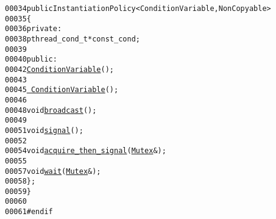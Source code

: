 \begin{footnotesize}
\begin{alltt}
00034         \textcolor{keyword}{public} InstantiationPolicy<ConditionVariable, NonCopyable>
00035     \{
00036         \textcolor{keyword}{private}:
00038             pthread\_cond\_t * \textcolor{keyword}{const} \_cond;
00039 
00040         \textcolor{keyword}{public}:
00042             \hyperlink{classeos_1_1ConditionVariable_a64b2350d3ef0bf6c58f0f063da7a4ea4}{ConditionVariable}();
00043 
00045             \hyperlink{classeos_1_1ConditionVariable_abf981bbbce2e09c235d461f7aea14479}{~ConditionVariable}();
00046 
00048             \textcolor{keywordtype}{void} \hyperlink{classeos_1_1ConditionVariable_a353db40ed7ea89d107627a4f32b829fe}{broadcast}();
00049 
00051             \textcolor{keywordtype}{void} \hyperlink{classeos_1_1ConditionVariable_a58e81670564c2096dcfdbf34dba8f4a4}{signal}();
00052 
00054             \textcolor{keywordtype}{void} \hyperlink{classeos_1_1ConditionVariable_adc82f6f8edc7d82776fe183d7f647d2c}{acquire_then_signal}(\hyperlink{classeos_1_1Mutex}{Mutex} &);
00055 
00057             \textcolor{keywordtype}{void} \hyperlink{classeos_1_1ConditionVariable_a42313d0ec24908e952f8b675a966a6a6}{wait}(\hyperlink{classeos_1_1Mutex}{Mutex} &);
00058     \};
00059 \}
00060 
00061 \textcolor{preprocessor}{#endif}
\end{alltt}\end{footnotesize}
